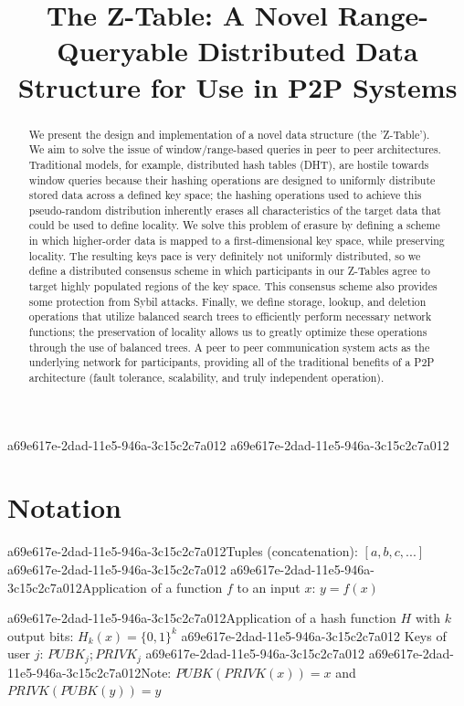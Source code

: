 \documentclass[12pt]{article}
\title{The Z-Table: A Novel Range-Queryable Distributed Data Structure for Use in P2P Systems}
\begin{document}
\maketitle
a69e617e-2dad-11e5-946a-3c15c2c7a012
a69e617e-2dad-11e5-946a-3c15c2c7a012\begin{abstract}
We present the design and implementation of a novel data structure (the 'Z-Table'). We aim to solve the issue of window/range-based queries in peer to peer architectures. Traditional models, for example,  distributed hash tables (DHT), are hostile towards window queries because their hashing operations are designed to uniformly distribute stored data across a defined key space; the hashing operations used to achieve this pseudo-random distribution inherently erases all characteristics of the target data that could be used to define locality. We solve this problem of erasure by defining a scheme in which higher-order data is mapped to a first-dimensional key space, while preserving locality. The resulting keys pace is very definitely not uniformly distributed, so we define a distributed consensus scheme in which participants in our Z-Tables agree to target highly populated regions of the key space. This consensus scheme also provides some protection from Sybil attacks. Finally, we define storage, lookup, and deletion operations that utilize balanced search trees to efficiently perform necessary network functions; the preservation of locality allows us to greatly optimize these operations through the use of balanced trees. A peer to peer communication system acts as the underlying network for participants, providing all of the traditional benefits of a P2P architecture (fault tolerance, scalability, and truly independent operation).
\end{abstract}

\section{Notation}

a69e617e-2dad-11e5-946a-3c15c2c7a012Tuples (concatenation): $[a,b,c,...]$
a69e617e-2dad-11e5-946a-3c15c2c7a012
a69e617e-2dad-11e5-946a-3c15c2c7a012Application of a function $f$ to an input $x$: $y=f(x)$

a69e617e-2dad-11e5-946a-3c15c2c7a012Application of a hash function $H$ with $k$ output bits: $H_{k}(x) = \{0,1\}^k$
a69e617e-2dad-11e5-946a-3c15c2c7a012
Keys of user $j$: $ PUBK_j; PRIVK_j $
a69e617e-2dad-11e5-946a-3c15c2c7a012
a69e617e-2dad-11e5-946a-3c15c2c7a012Note: $PUBK(PRIVK(x)) = x$ and $PRIVK(PUBK(y)) = y$~
\end{document}
